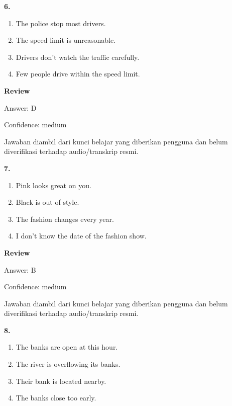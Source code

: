 \documentclass[12pt]{article}
\begin{document}
\noindent\textbf{6.}
\begin{enumerate}[label=(\Alph*),leftmargin=*,itemsep=0.2em]
\item The police stop most drivers.
\item The speed limit is unreasonable.
\item Drivers don't watch the traffic carefully.
\item Few people drive within the speed limit.
\end{enumerate}
\par
\begingroup
\setlength{\parskip}{0pt}
\setlength{\parindent}{0pt}
\textbf{Review}\par
Answer: D\par
Confidence: medium\par
Jawaban diambil dari kunci belajar yang diberikan pengguna dan belum diverifikasi terhadap audio/transkrip resmi.\par
\endgroup
\par
\vspace{0.25\baselineskip}
\noindent\textbf{7.}
\begin{enumerate}[label=(\Alph*),leftmargin=*,itemsep=0.2em]
\item Pink looks great on you.
\item Black is out of style.
\item The fashion changes every year.
\item I don't know the date of the fashion show.
\end{enumerate}
\par
\begingroup
\setlength{\parskip}{0pt}
\setlength{\parindent}{0pt}
\textbf{Review}\par
Answer: B\par
Confidence: medium\par
Jawaban diambil dari kunci belajar yang diberikan pengguna dan belum diverifikasi terhadap audio/transkrip resmi.\par
\endgroup
\par
\vspace{0.25\baselineskip}
\noindent\textbf{8.}
\begin{enumerate}[label=(\Alph*),leftmargin=*,itemsep=0.2em]
\item The banks are open at this hour.
\item The river is overflowing its banks.
\item Their bank is located nearby.
\item The banks close too early.
\end{enumerate}
\end{document}
